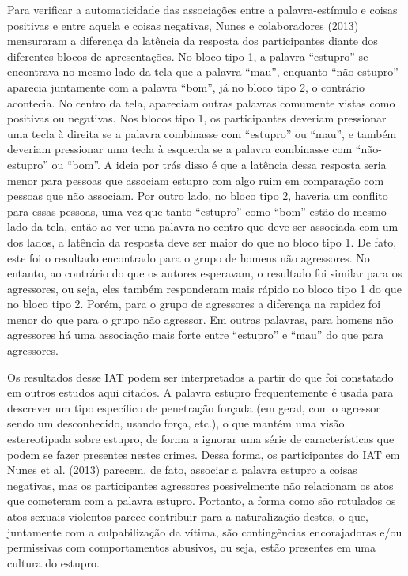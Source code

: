 Para verificar a automaticidade das associações entre a palavra-estímulo e coisas positivas e entre aquela e coisas negativas, Nunes e colaboradores (2013) mensuraram a diferença da latência da resposta dos participantes diante dos diferentes blocos de apresentações. No bloco tipo 1, a palavra ``estupro'' se encontrava no mesmo lado da tela que a palavra ``mau'', enquanto ``não-estupro'' aparecia juntamente com a palavra ``bom'', já no bloco tipo 2, o contrário acontecia. No centro da tela, apareciam outras palavras comumente vistas como positivas ou negativas. Nos blocos tipo 1, os participantes deveriam pressionar uma tecla à direita se a palavra combinasse com ``estupro'' ou ``mau'', e também deveriam pressionar uma tecla à esquerda se a palavra combinasse com ``não-estupro'' ou ``bom''. A ideia por trás disso é que a latência dessa resposta seria menor para pessoas que associam estupro com algo ruim em comparação com pessoas que não associam. Por outro lado, no bloco tipo 2, haveria um conflito para essas pessoas, uma vez que tanto ``estupro'' como ``bom'' estão do mesmo lado da tela, então ao ver uma palavra no centro que deve ser associada com um dos lados, a latência da resposta deve ser maior do que no bloco tipo 1. De fato, este foi o resultado encontrado para o grupo de homens não agressores. No entanto, ao contrário do que os autores esperavam, o resultado foi similar para os agressores, ou seja, eles também responderam mais rápido no bloco tipo 1 do que no bloco tipo 2. Porém, para o grupo de agressores a diferença na rapidez foi menor do que para o grupo não agressor. Em outras palavras, para homens não agressores há uma associação mais forte entre ``estupro'' e ``mau'' do que para agressores.

Os resultados desse IAT podem ser interpretados a partir do que foi constatado em outros estudos aqui citados. A palavra estupro frequentemente é usada para descrever um tipo específico de penetração forçada (em geral, com o agressor sendo um desconhecido, usando força, etc.), o que mantém uma visão estereotipada sobre estupro, de forma a ignorar uma série de características que podem se fazer presentes nestes crimes. Dessa forma, os participantes do IAT em Nunes et al. (2013) parecem, de fato, associar a palavra estupro a coisas negativas, mas os participantes agressores possivelmente não relacionam os atos que cometeram com a palavra estupro. Portanto, a forma como são rotulados os atos sexuais violentos parece contribuir para a naturalização destes, o que, juntamente com a culpabilização da vítima, são contingências encorajadoras e/ou permissivas com comportamentos abusivos, ou seja, estão presentes em uma cultura do estupro.

